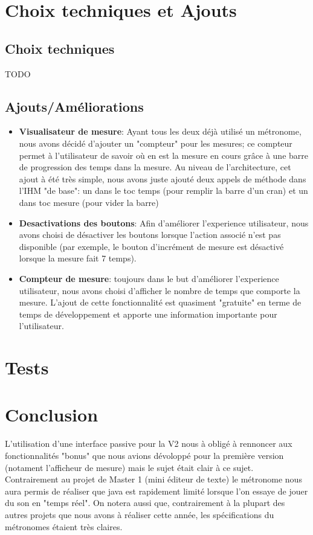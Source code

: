 \documentclass{article}
\begin{document}
\section{Choix techniques et Ajouts}
\subsection{Choix techniques}
TODO


\subsection{Ajouts/Améliorations}
\begin{itemize}
\item \textbf{Visualisateur de mesure}: Ayant tous les deux déjà utilisé un métronome, nous avons décidé d'ajouter un "compteur" pour les mesures; ce compteur permet à l'utilisateur de savoir où en est la mesure en cours grâce à une barre de progression des temps dans la mesure. Au niveau de l'architecture, cet ajout à été très simple, nous avons juste ajouté deux appels de méthode dans l'IHM "de base": un dans le toc temps (pour remplir la barre d'un cran) et un dans toc mesure (pour vider la barre)
\item \textbf{Desactivations des boutons}: Afin d'améliorer l'experience utilisateur, nous avons choisi de désactiver les boutons lorsque l'action associé n'est pas disponible (par exemple, le bouton d'incrément de mesure est désactivé lorsque la mesure fait 7 temps).
\item \textbf{Compteur de mesure}: toujours dans le but d'améliorer l'experience utilisateur, nous avons choisi d'afficher le nombre de temps que comporte la mesure. L'ajout de cette fonctionnalité est quasiment "gratuite" en terme de temps de développement et apporte une information importante pour l'utilisateur.
\end{itemize}

\section{Tests}


\section{Conclusion}
L'utilisation d'une interface passive pour la V2 nous à obligé à rennoncer aux fonctionnalités "bonus" que nous avions dévoloppé pour la première version (notament l'afficheur de mesure) mais le sujet était clair à ce sujet.
Contrairement au projet de Master 1 (mini éditeur de texte) le métronome nous aura permis de réaliser que java est rapidement limité lorsque l'on essaye de jouer du son en "temps réel". On notera aussi que, contrairement à la plupart des autres projets que nous avons à réaliser cette année, les spécifications du métronomes étaient très claires.
\end{document}
